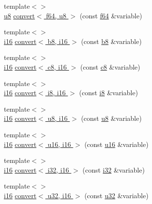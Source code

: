 \begin{DoxyCompactItemize}
\item 
{\footnotesize template$<$$>$ }\\\hyperlink{types_8h_a92c50087ca0e64fa93fc59402c55f8ca}{u8} \hyperlink{namespacecrap_a29456c9c103bc91a057fb2e84e63c08f}{convert$<$ f64, u8 $>$} (const \hyperlink{types_8h_a76c9f53497f766e57b184bc8a93ab73f}{f64} \&variable)
\item 
{\footnotesize template$<$$>$ }\\\hyperlink{types_8h_ad309dbcaeea13aa602d686964156ea0b}{i16} \hyperlink{namespacecrap_a9658b8cd351ac411e0ba878d5eba8a57}{convert$<$ b8, i16 $>$} (const \hyperlink{types_8h_a74eb47b4ab9e428eab7b91b3b877fa6c}{b8} \&variable)
\item 
{\footnotesize template$<$$>$ }\\\hyperlink{types_8h_ad309dbcaeea13aa602d686964156ea0b}{i16} \hyperlink{namespacecrap_a06ae44b5c7c2a948aec7157512b4bb38}{convert$<$ c8, i16 $>$} (const \hyperlink{types_8h_aa1ba8aac9fcd831012308297336ac74b}{c8} \&variable)
\item 
{\footnotesize template$<$$>$ }\\\hyperlink{types_8h_ad309dbcaeea13aa602d686964156ea0b}{i16} \hyperlink{namespacecrap_a9eb69fbd5915fd094237fdd56ad73ccf}{convert$<$ i8, i16 $>$} (const \hyperlink{types_8h_ae3702327b5f47e83b431e22b33da7b58}{i8} \&variable)
\item 
{\footnotesize template$<$$>$ }\\\hyperlink{types_8h_ad309dbcaeea13aa602d686964156ea0b}{i16} \hyperlink{namespacecrap_a41376c22837ff5ac066fccb24ad8b612}{convert$<$ u8, i16 $>$} (const \hyperlink{types_8h_a92c50087ca0e64fa93fc59402c55f8ca}{u8} \&variable)
\item 
{\footnotesize template$<$$>$ }\\\hyperlink{types_8h_ad309dbcaeea13aa602d686964156ea0b}{i16} \hyperlink{namespacecrap_a74d0df1da05f3f89c0f281b7ce66e9fe}{convert$<$ u16, i16 $>$} (const \hyperlink{types_8h_ace9d960e74685e2cd84b36132dbbf8aa}{u16} \&variable)
\item 
{\footnotesize template$<$$>$ }\\\hyperlink{types_8h_ad309dbcaeea13aa602d686964156ea0b}{i16} \hyperlink{namespacecrap_a4bb2a7fdfdbaa1c5fa13533e6e0798e5}{convert$<$ i32, i16 $>$} (const \hyperlink{types_8h_a48d6cd8e4135fb2ff7e7f2dac84089ec}{i32} \&variable)
\item 
{\footnotesize template$<$$>$ }\\\hyperlink{types_8h_ad309dbcaeea13aa602d686964156ea0b}{i16} \hyperlink{namespacecrap_a86512c6fc8bd197d145ac8e3027e58f1}{convert$<$ u32, i16 $>$} (const \hyperlink{types_8h_afaa62991928fb9fb18ff0db62a040aba}{u32} \&variable)

\end{DoxyCompactItemize}
